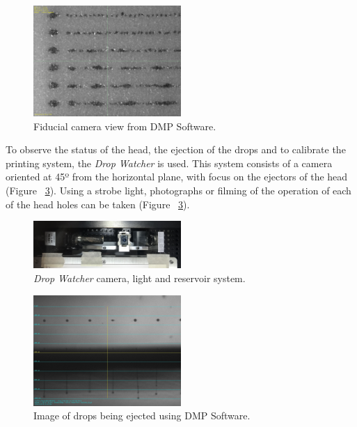 \begin{figure}[H]
  \centering
    \includegraphics[width=0.5\textwidth]{Figures/Figura_Vista_Camara_Fiducial}
  \caption{Fiducial camera view from DMP Software.}
  \label{fig:Figura_Vista_Camara_Fiducial}
\end{figure}

To observe the status of the head, the ejection of the drops and to calibrate the printing system, the \textit{Drop Watcher} is used. This system consists of a camera oriented at 45º from the horizontal plane, with focus on the ejectors of the head (Figure ~\ref{fig:Figura_Drop_Watcher}). Using a strobe light, photographs or filming of the operation of each of the head holes can be taken (Figure ~\ref{fig:Figura_Drop_Watcher}).

\begin{figure}[H]
  \centering
    \includegraphics[width=0.5\textwidth]{Figures/Figura_Camara_Drop_Watcher}
  \caption{\textit{Drop Watcher} camera, light and reservoir system.}
  \label{fig:Figura_Camara_Drop_Watcher}
\end{figure}

\begin{figure}[H]
  \centering
    \includegraphics[width=0.5\textwidth]{Figures/Figura_Drop_Watcher}
  \caption{Image of drops being ejected using DMP Software.}
  \label{fig:Figura_Drop_Watcher}
\end{figure}

